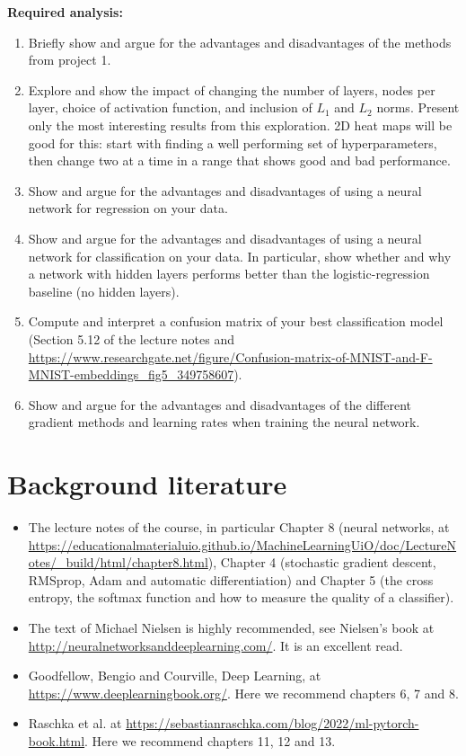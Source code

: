 \documentclass[11pt,a4paper]{article}
\begin{document}
\textbf{Required analysis:}
\begin{enumerate}[nosep]
  \item Briefly show and argue for the advantages and disadvantages of the
        methods from project 1.
  \item Explore and show the impact of changing the number of layers, nodes
        per layer, choice of activation function, and inclusion of $L_1$ and
        $L_2$ norms.  Present only the most interesting results from this
        exploration.  2D heat maps will be good for this: start with finding
        a well performing set of hyperparameters, then change two at a time
        in a range that shows good and bad performance.
  \item Show and argue for the advantages and disadvantages of using a
        neural network for regression on your data.
  \item Show and argue for the advantages and disadvantages of using a
        neural network for classification on your data.  In particular, show
        whether and why a network with hidden layers performs better than
        the logistic-regression baseline (no hidden layers).
  \item Compute and interpret a confusion matrix of your best classification
        model (Section 5.12 of the lecture notes and
        \url{https://www.researchgate.net/figure/Confusion-matrix-of-MNIST-and-F-MNIST-embeddings_fig5_349758607}).
  \item Show and argue for the advantages and disadvantages of the different
        gradient methods and learning rates when training the neural
        network.
\end{enumerate}

\section*{Background literature}

\begin{itemize}[nosep]
  \item The lecture notes of the course, in particular Chapter 8 (neural
        networks, at
        \url{https://educationalmaterialuio.github.io/MachineLearningUiO/doc/LectureNotes/_build/html/chapter8.html}),
        Chapter 4 (stochastic gradient descent, RMSprop, Adam and automatic
        differentiation) and Chapter 5 (the cross entropy, the softmax
        function and how to measure the quality of a classifier).
  \item The text of Michael Nielsen is highly recommended, see Nielsen's
        book at \url{http://neuralnetworksanddeeplearning.com/}.  It is an
        excellent read.
  \item Goodfellow, Bengio and Courville, Deep Learning, at
        \url{https://www.deeplearningbook.org/}.  Here we recommend chapters
        6, 7 and 8.
  \item Raschka et al. at
        \url{https://sebastianraschka.com/blog/2022/ml-pytorch-book.html}.
        Here we recommend chapters 11, 12 and 13.
\end{itemize}
\end{document}
